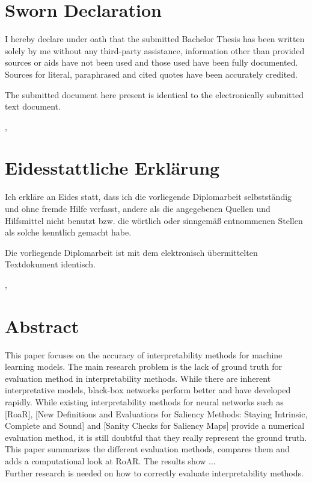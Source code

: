 
	\ifeng \chapter*{Sworn Declaration}
	I hereby declare under oath that the submitted Bachelor Thesis has been written solely by me without any third-party assistance, information other than provided sources or aids have not been used and those used have been fully documented. Sources for literal, paraphrased and cited quotes have been accurately credited.

	The submitted document here present is identical to the electronically submitted text document.

	\vskip1cm
	\place, \date

	\else \chapter*{Eidesstattliche Erklärung}
	Ich erkläre an Eides statt, dass ich die vorliegende Diplomarbeit selbstständig und ohne fremde Hilfe verfasst, andere als die angegebenen Quellen und Hilfsmittel nicht benutzt bzw. die wörtlich oder sinngemäß entnommenen Stellen als solche kenntlich gemacht habe.

	Die vorliegende Diplomarbeit ist mit dem elektronisch übermittelten Textdokument identisch.

	\vskip1cm
	\place, \date
	\fi

		\chapter*{Abstract}

	This paper focuses on the accuracy of interpretability methods for machine learning models. The main research problem is the lack of ground truth for evaluation method in interpretability methods. While there are inherent interpretative models, black-box networks perform better and have developed rapidly. While existing interpretability methods for neural networks such as [RoaR], [New Definitions and Evaluations for Saliency Methods: Staying Intrinsic, Complete and Sound] and [Sanity Checks for Saliency Maps] provide a numerical evaluation method, it is still doubtful that they really represent the ground truth. \\
	This paper summarizes the different evaluation methods, compares them and adds a computational look at RoAR. The results show ...\\
	Further research is needed on how to correctly evaluate interpretability methods.
	


